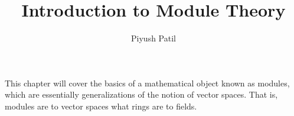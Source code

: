 \documentclass{article}
\begin{document}
\newcommand*{\tb}{\textbf}
\newcommand*{\ti}{\textit}
\newcommand*{\n}{\newline}
\newcommand*{\nn}{\newline \newline}
\newcommand*{\Pf}{\indent \ensuremath{\bullet} \textit{Proof}: }
\newcommand*{\In}{\indent \ensuremath{\bullet} \textit{Intuition}: }
\newcommand*{\Mo}{\indent \ensuremath{\bullet} \textit{Motivation}: }
\newcommand*{\Co}{\indent \ensuremath{\bullet} \textit{Corollary}: }
\newcommand*{\No}{\indent \ensuremath{\bullet} \textit{Notation}: }
\newcommand*{\N}{\mathbb{N}}
\newcommand*{\Z}{\mathbb{Z}}
\newcommand*{\Q}{\mathbb{Q}}
\newcommand*{\R}{\mathbb{R}}

\title{Introduction to Module Theory}
\author{Piyush Patil}
\maketitle

This chapter will cover the basics of a mathematical object known as modules, which are essentially generalizations of the notion of vector spaces. That is, modules are to vector spaces what rings are to fields.
\end{document}
